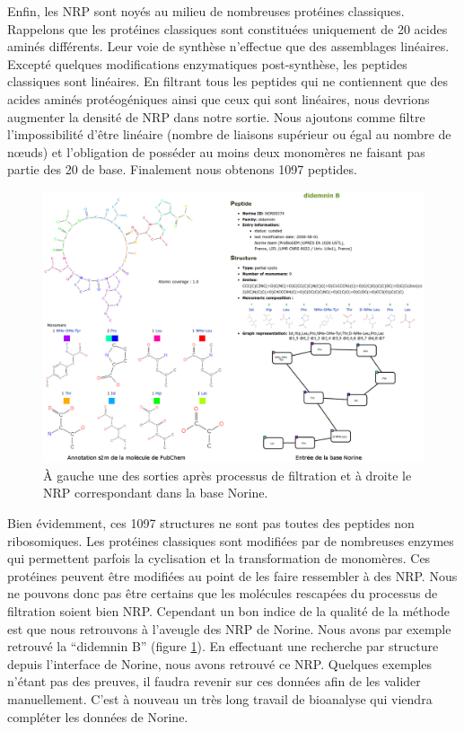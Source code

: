 Enfin, les NRP sont noyés au milieu de nombreuses protéines classiques.
Rappelons que les protéines classiques sont constituées uniquement de 20 acides aminés différents.
Leur voie de synthèse n'effectue que des assemblages linéaires.
Excepté quelques modifications enzymatiques post-synthèse, les peptides classiques sont linéaires.
En filtrant tous les peptides qui ne contiennent que des acides aminés 
protéogéniques ainsi que ceux qui sont linéaires, nous devrions augmenter la densité de NRP dans notre sortie.
Nous ajoutons comme filtre l'impossibilité d'être linéaire (nombre de liaisons supérieur ou égal au nombre de nœuds) et l'obligation de posséder au moins deux monomères ne faisant pas partie des 20 de base.
Finalement nous obtenons 1097 peptides.

\begin{figure}[h!]
  \begin{center}
    \includegraphics[width=450px]{Figures/contributions/didemnin_B.png}
    \caption{\label{didemin}À gauche une des sorties après processus de filtration et à droite le NRP correspondant dans la base Norine.}
  \end{center}
\end{figure}

Bien évidemment, ces 1097 structures ne sont pas toutes des peptides non ribosomiques.
Les protéines classiques sont modifiées par de nombreuses enzymes qui permettent parfois la cyclisation et la transformation de monomères.
Ces protéines peuvent être modifiées au point de les faire ressembler à des NRP.
Nous ne pouvons donc pas être certains que les molécules rescapées du processus de filtration soient bien NRP.
Cependant un bon indice de la qualité de la méthode est que nous retrouvons à l'aveugle des NRP de Norine.
Nous avons par exemple retrouvé la ``didemnin B'' (figure \ref{didemin}).
En effectuant une recherche par structure depuis l'interface de Norine, nous avons retrouvé ce NRP.
Quelques exemples n'étant pas des preuves, il faudra revenir sur ces données afin de les valider manuellement.
C'est à nouveau un très long travail de bioanalyse qui viendra compléter les données de Norine.



